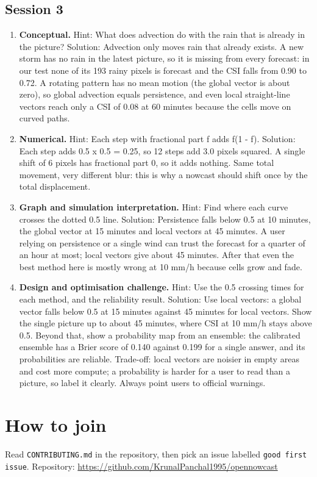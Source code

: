 \documentclass[11pt,a4paper]{article}
\begin{document}
\subsection*{Session 3}
\begin{enumerate}[nosep]
\item \textbf{Conceptual.} Hint: What does advection do with the rain that is already in the picture? Solution: Advection only moves rain that already exists. A new storm has no rain in the latest picture, so it is missing from every forecast: in our test none of its 193 rainy pixels is forecast and the CSI falls from 0.90 to 0.72. A rotating pattern has no mean motion (the global vector is about zero), so global advection equals persistence, and even local straight-line vectors reach only a CSI of 0.08 at 60 minutes because the cells move on curved paths.
\item \textbf{Numerical.} Hint: Each step with fractional part f adds f(1 - f). Solution: Each step adds 0.5 x 0.5 = 0.25, so 12 steps add 3.0 pixels squared. A single shift of 6 pixels has fractional part 0, so it adds nothing. Same total movement, very different blur: this is why a nowcast should shift once by the total displacement.
\item \textbf{Graph and simulation interpretation.} Hint: Find where each curve crosses the dotted 0.5 line. Solution: Persistence falls below 0.5 at 10 minutes, the global vector at 15 minutes and local vectors at 45 minutes. A user relying on persistence or a single wind can trust the forecast for a quarter of an hour at most; local vectors give about 45 minutes. After that even the best method here is mostly wrong at 10 mm/h because cells grow and fade.
\item \textbf{Design and optimisation challenge.} Hint: Use the 0.5 crossing times for each method, and the reliability result. Solution: Use local vectors: a global vector falls below 0.5 at 15 minutes against 45 minutes for local vectors. Show the single picture up to about 45 minutes, where CSI at 10 mm/h stays above 0.5. Beyond that, show a probability map from an ensemble: the calibrated ensemble has a Brier score of 0.140 against 0.199 for a single answer, and its probabilities are reliable. Trade-off: local vectors are noisier in empty areas and cost more compute; a probability is harder for a user to read than a picture, so label it clearly. Always point users to official warnings.
\end{enumerate}

\section{How to join}
Read \texttt{CONTRIBUTING.md} in the repository, then pick an issue labelled \texttt{good first issue}. Repository: \url{https://github.com/KrunalPanchal1995/opennowcast}
\end{document}
